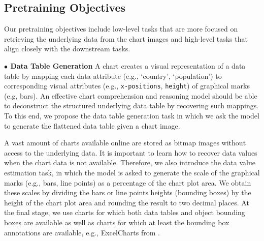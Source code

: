 \subsection{Pretraining Objectives} \label{subsec:pretraining_objectives}

Our pretraining objectives include low-level tasks that are more focused on retrieving the underlying data from the chart images and high-level tasks that align closely with the downstream tasks. 



\noindent \textbf{$\bullet$ {Data Table Generation}}
A chart creates a visual representation of a data table by mapping each data attribute (e.g., `country', `population') to corresponding visual attributes (e.g., \texttt{x-positions}, \texttt{height}) of graphical marks (e.g, bars). An effective chart comprehension and reasoning model should be able to deconstruct the structured underlying data table by recovering such mappings. To this end, we propose the data table generation task in which we ask the model to generate the flattened data table given a chart image.

A vast amount of charts available online are stored as bitmap images without access to the underlying data. It is important to learn how to recover data values when the chart data is not available. Therefore, we also introduce the  data value estimation task, in which the model is asked to generate the scale of the graphical marks (e.g., bars, line points) as a percentage of the chart plot area. We obtain these scales by dividing the bars or line points heights (bounding boxes) by the height of the chart plot area and rounding the result to two decimal places. At the final stage, we use charts for which both data tables and object bounding boxes are available as well as charts for which at least the bounding box annotations are available, e.g., ExcelCharts from \cite{ChartOCR}.

 

